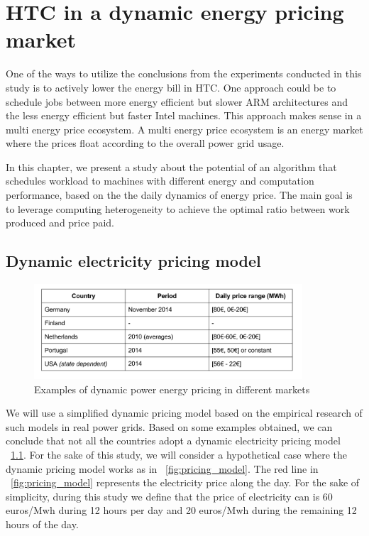 \chapter{HTC in a dynamic energy pricing market}

One of the ways to utilize the conclusions from the experiments conducted in this study is to actively lower the energy bill in HTC. One approach could be to schedule jobs between more energy efficient but slower ARM architectures and the less energy efficient but faster Intel machines. This approach makes sense in a multi energy price ecosystem. A multi energy price ecosystem is an energy market where the prices float according to the overall power grid usage.

In this chapter, we present a study about the potential of an algorithm that schedules workload to machines with different energy and computation performance, based on the the daily dynamics of energy price. The main goal is to leverage computing heterogeneity to achieve the optimal ratio between work produced and price paid.  

\section{Dynamic electricity pricing model}

\begin{figure}[hours]
  \centering
    \includegraphics[width=100mm]{"img/pricing_model_table"}
    \caption{Examples of dynamic power energy pricing in different markets}
    \label{fig:pricing_model_table}
\end{figure}

We will use a simplified dynamic pricing model based on the empirical research of such models in real power grids. Based on some examples obtained, we can conclude that not all the countries adopt a dynamic electricity pricing model ~\ref{fig:pricing_model_table}. For the sake of this study, we will consider a hypothetical case where the dynamic pricing model works as in ~\ref{fig:pricing_model}. The red line in ~\ref{fig:pricing_model} represents the electricity price along the day. For the sake of simplicity, during this study we define that the price of electricity can is  60 euros/Mwh during 12 hours per day and 20 euros/Mwh during the remaining 12 hours of the day.  
	
